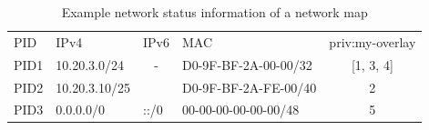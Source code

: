 \begin{table}[]
\caption{Example network status information of a network map}
\begin{tabular}{llllc}
PID  & IPv4          & IPv6                  & MAC                  & \multicolumn{1}{l}{priv:my-overlay} \\
PID1 & 10.20.3.0/24  & \multicolumn{1}{c}{-} & D0-9F-BF-2A-00-00/32 & [1, 3, 4]                           \\
PID2 & 10.20.3.10/25 & \multicolumn{1}{c}{}  & D0-9F-BF-2A-FE-00/40 & 2                                   \\
PID3 & 0.0.0.0/0     & ::/0                  & 00-00-00-00-00-00/48 & 5
\end{tabular}
\label{table:networkmap-example}
\end{table}

